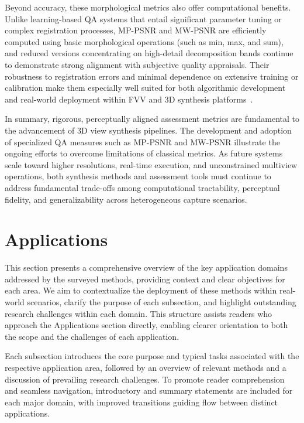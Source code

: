 \documentclass[sigconf]{acmart}
\begin{document}
Beyond accuracy, these morphological metrics also offer computational benefits. Unlike learning-based QA systems that entail significant parameter tuning or complex registration processes, MP-PSNR and MW-PSNR are efficiently computed using basic morphological operations (such as min, max, and sum), and reduced versions concentrating on high-detail decomposition bands continue to demonstrate strong alignment with subjective quality appraisals. Their robustness to registration errors and minimal dependence on extensive training or calibration make them especially well suited for both algorithmic development and real-world deployment within FVV and 3D synthesis platforms~\cite{refQARef99}.

In summary, rigorous, perceptually aligned assessment metrics are fundamental to the advancement of 3D view synthesis pipelines. The development and adoption of specialized QA measures such as MP-PSNR and MW-PSNR illustrate the ongoing efforts to overcome limitations of classical metrics. As future systems scale toward higher resolutions, real-time execution, and unconstrained multiview operations, both synthesis methods and assessment tools must continue to address fundamental trade-offs among computational tractability, perceptual fidelity, and generalizability across heterogeneous capture scenarios.

\section{Applications}

This section presents a comprehensive overview of the key application domains addressed by the surveyed methods, providing context and clear objectives for each area. We aim to contextualize the deployment of these methods within real-world scenarios, clarify the purpose of each subsection, and highlight outstanding research challenges within each domain. This structure assists readers who approach the Applications section directly, enabling clearer orientation to both the scope and the challenges of each application.

Each subsection introduces the core purpose and typical tasks associated with the respective application area, followed by an overview of relevant methods and a discussion of prevailing research challenges. To promote reader comprehension and seamless navigation, introductory and summary statements are included for each major domain, with improved transitions guiding flow between distinct applications. 
\end{document}

